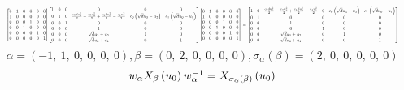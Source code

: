 \documentclass[11pt]{article}
\theoremstyle{definition}
\begin{document}
\[
\scaletoalign{\textwidth}{{\left[\begin{matrix}0 & 1 & 0 & 0 & 0 & 0\\1 & 0 & 0 & 0 & 0 & 0\\0 & 0 & 0 & 1 & 0 & 0\\0 & 0 & 1 & 0 & 0 & 0\\0 & 0 & 0 & 0 & 1 & 0\\0 & 0 & 0 & 0 & 0 & 1\end{matrix}\right]} {\left[\begin{matrix}1 & 0 & 0 & 0 & 0 & 0\\0 & 1 & 0 & \frac{c_{0} d u_{3}^{2}}{2} - \frac{c_{0} u_{2}^{2}}{2} + \frac{c_{1} d u_{0}^{2}}{2} - \frac{c_{1} u_{1}^{2}}{2} & c_{0} \left(\sqrt{d} u_{3} - u_{2}\right) & c_{1} \left(\sqrt{d} u_{0} - u_{1}\right)\\0 & 0 & 1 & 0 & 0 & 0\\0 & 0 & 0 & 1 & 0 & 0\\0 & 0 & 0 & \sqrt{d} u_{3} + u_{2} & 1 & 0\\0 & 0 & 0 & \sqrt{d} u_{0} + u_{1} & 0 & 1\end{matrix}\right]} {\left[\begin{matrix}0 & 1 & 0 & 0 & 0 & 0\\1 & 0 & 0 & 0 & 0 & 0\\0 & 0 & 0 & 1 & 0 & 0\\0 & 0 & 1 & 0 & 0 & 0\\0 & 0 & 0 & 0 & 1 & 0\\0 & 0 & 0 & 0 & 0 & 1\end{matrix}\right]} = {\left[\begin{matrix}1 & 0 & \frac{c_{0} d u_{3}^{2}}{2} - \frac{c_{0} u_{2}^{2}}{2} + \frac{c_{1} d u_{0}^{2}}{2} - \frac{c_{1} u_{1}^{2}}{2} & 0 & c_{0} \left(\sqrt{d} u_{3} - u_{2}\right) & c_{1} \left(\sqrt{d} u_{0} - u_{1}\right)\\0 & 1 & 0 & 0 & 0 & 0\\0 & 0 & 1 & 0 & 0 & 0\\0 & 0 & 0 & 1 & 0 & 0\\0 & 0 & \sqrt{d} u_{3} + u_{2} & 0 & 1 & 0\\0 & 0 & \sqrt{d} u_{0} + u_{1} & 0 & 0 & 1\end{matrix}\right]}}
\]
\[
\alpha = \left( -1, \  1, \  0, \  0, \  0, \  0\right), \beta = \left( 0, \  2, \  0, \  0, \  0, \  0\right), \sigma_{\alpha}(\beta) = \left( 2, \  0, \  0, \  0, \  0, \  0\right)
\]
\[
\scaletoalign{\textwidth}{w_{\alpha} X_{\beta}\left(u_{0}\right) w_{\alpha}^{-1} = X_{\sigma_{\alpha}\left(\beta\right)}\left(u_{0}\right)}
\]
\end{document}
